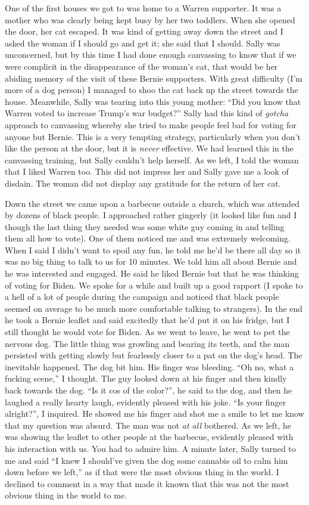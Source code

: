 \documentclass[]{book}
\begin{document}
One of the first houses we got to was home to a Warren supporter. It was a mother who was clearly being kept busy by her two toddlers. When she opened the door, her cat escaped. It was kind of getting away down the street and I asked the woman if I should go and get it; she said that I should. Sally was unconcerned, but by this time I had done enough canvassing to know that if we were complicit in the disappearance of the woman's cat, that would be her abiding memory of the visit of these Bernie supporters. With great difficulty (I'm more of a dog person) I managed to shoo the cat back up the street towards the house. Meanwhile, Sally was tearing into this young mother: ``Did you know that Warren voted to increase Trump's war budget?'' Sally had this kind of \emph{gotcha} approach to canvassing whereby she tried to make people feel bad for voting for anyone but Bernie. This is a very tempting strategy, particularly when you don't like the person at the door, but it is \emph{never} effective. We had learned this in the canvassing training, but Sally couldn't help herself. As we left, I told the woman that I liked Warren too. This did not impress her and Sally gave me a look of disdain. The woman did not display any gratitude for the return of her cat.

Down the street we came upon a barbecue outside a church, which was attended by dozens of black people. I approached rather gingerly (it looked like fun and I though the last thing they needed was some white guy coming in and telling them all how to vote). One of them noticed me and was extremely welcoming. When I said I didn't want to spoil any fun, he told me he'd be there all day so it was no big thing to talk to us for 10 minutes. We told him all about Bernie and he was interested and engaged. He said he liked Bernie but that he was thinking of voting for Biden. We spoke for a while and built up a good rapport (I spoke to a hell of a lot of people during the campaign and noticed that black people seemed on average to be much more comfortable talking to strangers). In the end he took a Bernie leaflet and said excitedly that he'd put it on his fridge, but I still thought he would vote for Biden. As we went to leave, he went to pet the nervous dog. The little thing was growling and bearing its teeth, and the man persisted with getting slowly but fearlessly closer to a pat on the dog's head. The inevitable happened. The dog bit him. His finger was bleeding. ``Oh no, what a fucking scene,'' I thought. The guy looked down at his finger and then kindly back towards the dog. ``Is it cos of the color?'', he said to the dog, and then he laughed a really hearty laugh, evidently pleased with his joke. ``Is your finger alright?'', I inquired. He showed me his finger and shot me a smile to let me know that my question was absurd. The man was not \emph{at all} bothered. As we left, he was showing the leaflet to other people at the barbecue, evidently pleased with his interaction with us. You had to admire him. A minute later, Sally turned to me and said ``I knew I should've given the dog some cannabis oil to calm him down before we left,'' as if that were the most obvious thing in the world. I declined to comment in a way that made it known that this was not the most obvious thing in the world to me.
\end{document}
